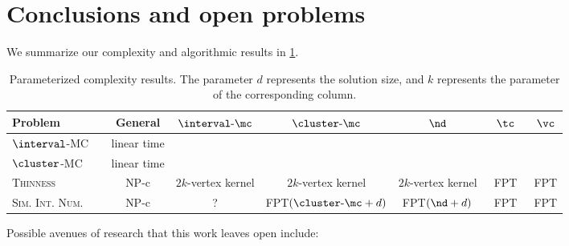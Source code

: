 \documentclass[11pt]{article}
\theoremstyle{plain}
\theoremstyle{definition}
\theoremstyle{remark}
\newcommand{\intervalmc}{\text{$\interval$-$\mc$}}
\newcommand{\clustermc}{\text{$\cluster$-$\mc$}}
\newcommand{\cm}{\clustermc}
\newcommand{\FPT}{{\smaller[0.83]\textsf{\textup{FPT}}}\xspace}
\newcommand{\NP}{{\smaller[0.83]\textsf{\textup{NP}}}}
\begin{document}
\section{Conclusions and open problems}
\label{sec:open-problems}
We summarize our complexity and algorithmic results in \cref{tab:results}.  

\begin{table}[h]
\footnotesize
\centering
\begin{tabular}[t]{lcccccc}
\toprule
Problem & General & $\intervalmc$ & $\cm$ & $\nd$ & $\tc$ & $\vc$ \\
\midrule
\textsc{$\interval$-MC}  & linear time & & & & &  \\
\textsc{$\cluster$-MC}  & linear time & & & & & \\
\textsc{Thinness}  & ~\NP-c~ & $2k$-vertex kernel & $2k$-vertex kernel & $2k$-vertex kernel & ~\FPT~ & \FPT \\
\textsc{Sim. Int. Num.}~~~  & ~\NP-c~ & ? & \FPT $(\cm + d)$ & \FPT $(\nd + d)$ & ~\FPT~ & \FPT\\
\bottomrule
\end{tabular}
\caption{Parameterized complexity results. The parameter $d$ represents the solution size, and $k$ represents the parameter of the corresponding column.}\label{tab:results}
\end{table}%

Possible avenues of research that this work leaves open include:
\end{document}

